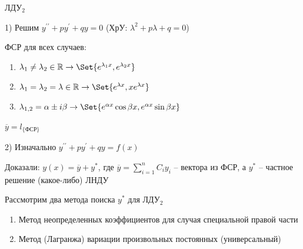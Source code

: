 \documentclass[12pt]{article}
\begin{document}
    \Mem ЛДУ$_2$

    1) Решим $y^{\prime\prime} + py^\prime + qy = 0$ (ХрУ: $\lambda^2 + p \lambda + q = 0$)

    ФСР для всех случаев:

    \begin{enumerate}
        \item $\lambda_1 \neq \lambda_2 \in \Real \to \Set{e^{\lambda_1 x}, e^{\lambda_2 x}}$

        \item $\lambda_1 = \lambda_2 = \lambda \in \Real \to \Set{e^{\lambda x}, xe^{\lambda x}}$

        \item $\lambda_{1,2} = \alpha \pm i \beta \to \Set{e^{\alpha x} \cos \beta x, e^{\alpha x} \sin \beta x}$
    \end{enumerate}

    $\overline{y} = l_{\{\text{ФСР}\}}$

    2) Изначально $y^{\prime\prime} + py^\prime + qy = f(x)$

    Доказали: $y(x) = \overline{y} + y^*$, где $\overline{y} = \sum_{i=1}^n C_i y_i$ -- вектора из ФСР, а $y^*$ -- частное решение (какое-либо) ЛНДУ

    \Nota Рассмотрим два метода поиска $y^*$ для ЛДУ$_2$

    \begin{enumerate}
        \item Метод неопределенных коэффициентов для случая специальной правой части

        \item Метод (Лагранжа) вариации произвольных постоянных (универсальный)
    \end{enumerate}

    \mediumvspace

    \hypertarget{specialrightpart}{}
\end{document}
